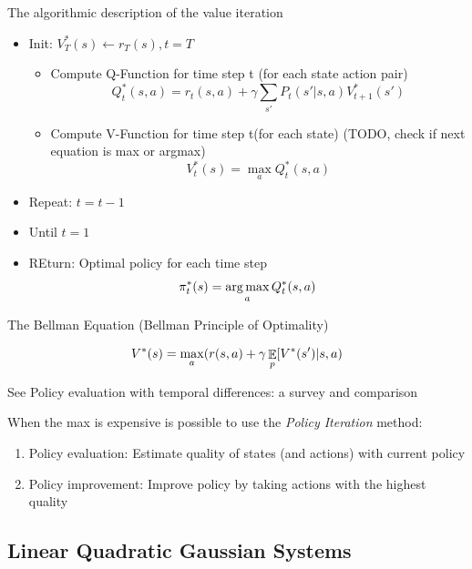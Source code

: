 \documentclass[b5paper]{report}
\begin{document}
The algorithmic description of the value iteration

\begin{itemize}
  \item Init: $V_T^*(s) \leftarrow r_T(s), t=T$
    \begin{itemize}
      \item Compute Q-Function for time step t (for each state action pair)
        \begin{equation}
          Q_t^*(s,a) = r_t(s,a) + \gamma \sum_{s'} P_t (s'|s,a)V_{t+1}^*(s')
        \end{equation}
      \item Compute V-Function for time step t(for each state) (TODO, check if
        next equation is max or argmax)
        \begin{equation}
          V_t^*(s) = \max_a Q_t^*(s,a)
        \end{equation}
    \end{itemize}
  \item Repeat: $t=t-1$
  \item Until $t=1$
  \item REturn: Optimal policy for each time step
    \begin{equation}
      \pi_t^*(s) = \operatorname*{arg\,max}_a Q_t^*(s,a)
    \end{equation}
\end{itemize}

The Bellman Equation (Bellman Principle of Optimality)

\begin{equation}
  V^*(s) = \max_a (r(s,a) + \gamma \operatorname*{\mathbb{\mathop{E}}}_p[V^*(s')|s,a)
\end{equation}


See Policy evaluation with temporal differences: a survey and comparison
\cite{dann2014policy}

When the max is expensive is possible to use the \emph{Policy Iteration}
method:

\begin{enumerate}
  \item Policy evaluation: Estimate quality of states (and actions) with
    current policy
  \item Policy improvement: Improve policy by taking actions with the highest
    quality
\end{enumerate}

\subsection{Linear Quadratic Gaussian Systems}
\end{document}
